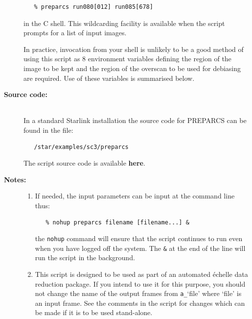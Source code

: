 \documentclass[twoside,11pt]{article}
\newcommand{\htmlref}[2]{#1}
\newenvironment{latexonly}{}{}
\renewcommand{\_}{\texttt{\symbol{95}}}
\begin{document}
\begin{description}
\begin{verbatim}
   % preparcs run080[012] run085[678]
\end{verbatim}

     in the C shell.  This wildcarding facility is available when the
     script prompts for a list of input images.

     In practice, invocation from your shell is unlikely to be a good
     method of using this script as 8 environment variables defining
     the region of the image to be kept and the region of the overscan
     to be used for debiasing are required.  Use of these variables is
     summarised below.

\item [{\bf Source code:}] \mbox{} \\
\begin{latexonly}
In a standard Starlink installation the source code for PREPARCS can be found
in the file:
\begin{verbatim}
   /star/examples/sc3/preparcs
\end{verbatim}
\end{latexonly}
\begin{htmlonly}
      The script source code is available
      \htmlref{{\bf here}}{se_preparcs_source}.
\end{htmlonly}

\item [{\bf Notes:}] \mbox{}
\begin{enumerate}

\item If needed, the input parameters can be input at the command
      line thus:

\begin{verbatim}
   % nohup preparcs filename [filename...] &
\end{verbatim}

      the \verb+nohup+ command will ensure that the script continues
      to run even when you have logged off the system.  The \verb+&+ at
      the end of the line will run the script in the background.

\item This script is designed to be used as part of an automated
      \'{e}chelle data reduction package.  If you intend to use it
      for this purpose, you should not change the name of the output
      frames from \verb+a_+`file' where `file' is an input frame.  See the
      comments in the script for changes which can be made if it is
      to be used stand-alone.


\end{enumerate}
\end{description}
\end{document}
